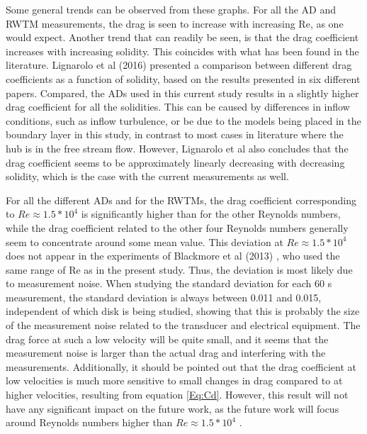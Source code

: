 Some general trends can be observed from these graphs. For all the \gls{AD} and \gls{RWTM} measurements, the drag is seen to increase with increasing Re, as one would expect. Another trend that can readily be seen, is that the drag coefficient increases with increasing solidity. This coincides with what has been found in the literature. Lignarolo et al (2016) \cite{Lignarolo2016} presented a comparison between different drag coefficients as a function of solidity, based on the results presented in six different papers. Compared, the \gls{AD}s used in this current study results in a slightly higher drag coefficient for all the solidities. This can be caused by differences in inflow conditions, such as inflow turbulence, or be due to the models being placed in the boundary layer in this study, in contrast to most cases in literature where the hub is in the free stream flow. However, Lignarolo et al also concludes that the drag coefficient seems to be approximately linearly decreasing with decreasing solidity, which is the case with the current measurements as well. 

For all the different \gls{AD}s and for the \gls{RWTM}s, the drag coefficient corresponding to $Re \approx 1.5*10^4$ is significantly higher than for the other Reynolds numbers, while the drag coefficient related to the other four Reynolds numbers generally seem to concentrate around some mean value. This deviation at $Re \approx 1.5*10^4$ does not appear in the experiments of Blackmore et al (2013) \cite{Blackmore2013}, who used the same range of Re as in the present study. Thus, the deviation is most likely due to measurement noise. When studying the standard deviation for each 60 \si{\s} measurement, the standard deviation is always between 0.011 and 0.015, independent of which disk is being studied, showing that this is probably the size of the measurement noise related to the transducer and electrical equipment. The drag force at such a low velocity will be quite small, and it seems that the measurement noise is larger than the actual drag and interfering with the measurements. Additionally, it should be pointed out that the drag coefficient at low velocities is much more sensitive to small changes in drag compared to at higher velocities, resulting from equation \ref{Eq:Cd}. However, this result will not have any significant impact on the future work, as the future work will focus around Reynolds numbers higher than $Re \approx 1.5*10^4$ .

